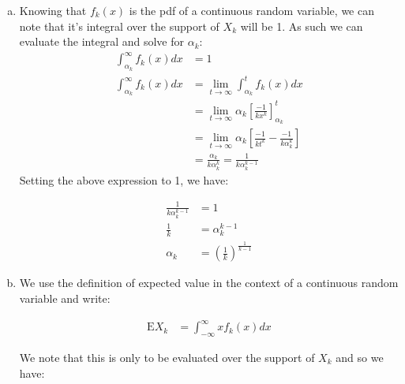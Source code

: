 \documentclass[11pt]{article}
\begin{document}
\begin{enumerate}[(a)]
  \item Knowing that $f_k(x)$ is the pdf of a continuous random variable, we can note that it's integral over the support of $X_k$ will be 1.  As such we can evaluate the integral and solve for $\alpha_k$:
    \begin{align*}
      \int_{\alpha_k}^{\infty} f_k(x) dx &= 1 \\
      \int_{\alpha_k}^{\infty} f_k(x) dx &= \lim_{t \rightarrow \infty} \int_{\alpha_k}^t f_k(x) dx \\
      &= \lim_{t \rightarrow \infty} \alpha_k \left[ \frac{-1}{kx^k} \right]_{\alpha_k}^{t} \\
      &= \lim_{t \rightarrow \infty} \alpha_k \left[ \frac{-1}{kt^k} - \frac{-1}{k \alpha_k^k} \right] \\
      &= \frac{\alpha_k}{k \alpha_k^k} = \frac{1}{k \alpha_k^{k-1}}
    \end{align*}
    Setting the above expression to 1, we have:

    \begin{align*}
      \frac{1}{k \alpha_k^{k-1}} &= 1 \\
      \frac{1}{k} &= \alpha_k^{k-1} \\
      \alpha_k &= \left( \frac{1}{k} \right)^{\frac{1}{k-1}}
    \end{align*}

  \item We use the definition of expected value in the context of a continuous random variable and write:

    \begin{align*}
      \mathrm{E} X_k &= \int_{-\infty}^{\infty} x f_k(x) dx
    \end{align*}

    We note that this is only to be evaluated over the support of $X_k$ and so we have:


\end{enumerate}
\end{document}
